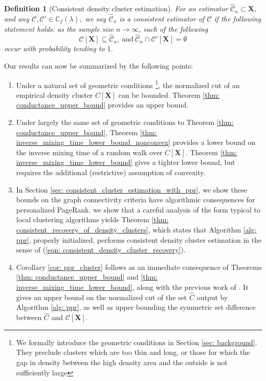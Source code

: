\documentclass{article}
\newcommand{\1}{\mathbf{1}}
\newcommand{\Xbf}{\mathbf{X}}
\newcommand{\Cbb}{\mathbb{C}}
\newcommand{\Cset}{\mathcal{C}}
\theoremstyle{aldenthm}
\newtheorem{definition}{Definition}
\theoremstyle{aldenrmrk}
\begin{document}
\begin{definition}[Consistent density cluster estimation]
	\label{def: consistent_density_cluster_estimation}
	For an estimator $\widehat{\Cset}_n \subset \Xbf$, and any $\Cset, \Cset' \in \Cbb_f(\lambda),$ we say $\widehat{\Cset}_n$ is a consistent estimator of $\Cset$ if the following statement holds: as the sample size $n \to \infty$, each of the following
	\begin{equation}
	\label{eqn: consistent_density_cluster_recovery}
	\Cset[\Xbf] \subseteq \widehat{\Cset}_n, ~\mathrm{ and }~ \widehat{\Cset}_n \cap \Cset'[\Xbf] = \emptyset
	\end{equation}
	occur with probability tending to $1$.
	
\end{definition}


Our results can now be summarized by the following points:

\begin{enumerate}
	\item 
	Under a natural set of geometric conditions
	\footnote{We formally introduce the geometric conditions in Section \ref{sec: background}. They preclude clusters which are too thin and long, or those for which the gap in density between the high density area and the outside is not sufficiently large}, 
	the normalized cut of an empirical density cluster $C[\Xbf]$ can be bounded. Theorem \ref{thm: conductance_upper_bound} provides an upper bound.

	\item Under largely the same set of geometric conditions to Theorem \ref{thm: conductance_upper_bound}, Theorem \ref{thm: inverse_mixing_time_lower_bound_nonconvex} provides a lower bound on the inverse mixing time of a random walk over $C[\Xbf]$. Theorem \ref{thm: inverse_mixing_time_lower_bound} gives a tighter lower bound, but requires the additional (restrictive) assumption of convexity.
	
	\item 
	In Section \ref{sec: consistent_cluster_estimation_with_ppr}, we show these bounds on the graph connectivity criteria have algorithmic consequences for personalized PageRank. we show that a careful analysis of the form typical to local clustering algorithms yields Theorem \ref{thm: consistent_recovery_of_density_clusters}, which states that Algorithm \ref{alg: ppr}, properly initialized, performs consistent density cluster estimation in the sense of (\ref{eqn: consistent_density_cluster_recovery}).
	
	\item Corollary \ref{cor: ppr_cluster} follows as an immediate consequence of Theorems \ref{thm: conductance_upper_bound} and \ref{thm: inverse_mixing_time_lower_bound}, along with the previous work of \cite{zhu2013}. It gives an upper bound on the normalized cut of the set $\widehat{C}$ output by Algorithm \ref{alg: ppr}, as well as upper bounding the symmetric set difference between $\widehat{C}$ and $\Cset[\Xbf]$.
\end{enumerate}
\end{document}
